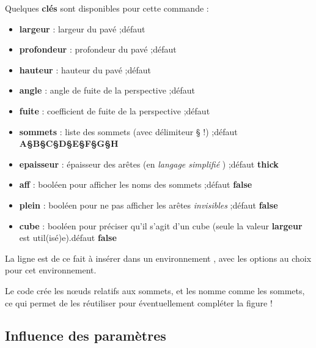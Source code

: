\documentclass{article}
\newcommand\Cle[1]{{\bfseries\sffamily\textlangle #1\textrangle}}
\begin{document}
\begin{codecles}
Quelques \Cle{clés} sont disponibles pour cette commande :

\begin{itemize}
	\item \Cle{largeur} : largeur du pavé ;\hfill{}défaut \Cle{2}
	\item \Cle{profondeur} : profondeur du pavé ;\hfill{}défaut \Cle{1}
	\item \Cle{hauteur} : hauteur du pavé ;\hfill{}défaut \Cle{1.25}
	\item \Cle{angle} : angle de fuite de la perspective ;\hfill{}défaut \Cle{30}
	\item \Cle{fuite} : coefficient de fuite de la perspective ;\hfill{}défaut \Cle{0.5}
	\item \Cle{sommets} : liste des sommets (avec délimiteur § !) ;\hfill{}défaut \Cle{A§B§C§D§E§F§G§H}
	\item \Cle{epaisseur} : épaisseur des arêtes (en \textit{langage simplifié} \TikZ) ;\hfill{}défaut \Cle{thick}
	\item \Cle{aff} : booléen pour afficher les noms des sommets ;\hfill{}défaut \Cle{false}
	\item \Cle{plein} : booléen pour ne pas afficher les arêtes \textit{invisibles} ;\hfill{}défaut \Cle{false}
	\item \Cle{cube} : booléen pour préciser qu'il s'agit d'un cube (seule la valeur \Cle{largeur} est util(isé)e).\hfill{}défaut \Cle{false}
\end{itemize}
\end{codecles}

\begin{codetex}
\pavePL
\end{codetex}

\begin{codetex}
\pavePL[cube,largeur=2]
\end{codetex}

\begin{codeinfo}
La ligne est de ce fait à insérer dans un environnement \TikZ, avec les options au choix pour cet environnement.

Le code crée les nœuds relatifs aux sommets, et les nomme comme les sommets, ce qui permet de les réutiliser pour éventuellement compléter la figure !
\end{codeinfo}

\subsection{Influence des paramètres}
\end{document}
